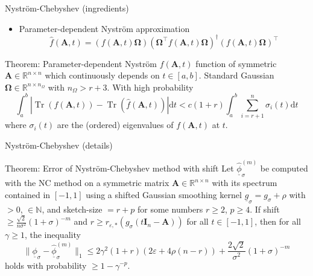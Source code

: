 \documentclass[aspectratio=169, leqno, 12pt]{beamer}
\newcommand{\mtx}[1]{\boldsymbol{#1}}
\DeclareMathOperator{\Tr}{Tr}
\begin{document}
\begin{frame}{Nystr\"om-Chebyshev (ingredients)}
    \begin{itemize}
        \item Parameter-dependent Nystr\"om approximation
        \begin{equation}
            \widehat{f}(\mtx{A}, t) = (f(\mtx{A}, t) \mtx{\Omega}) (\mtx{\Omega}^{\top} f(\mtx{A}, t) \mtx{\Omega})^{\dagger} (f(\mtx{A}, t) \mtx{\Omega})^{\top}
        \end{equation}
    \end{itemize}
    \begin{block}{Theorem: Parameter-dependent Nystr\"om \cite{he2023parameter}}
        $f(\mtx{A}, t)$ function of symmetric $\mtx{A} \in \mathbb{R}^{n \times n}$ which
        continuously depends on $t \in [a,b]$. 
        Standard Gaussian $\mtx{\Omega} \in \mathbb{R}^{n \times n_{\Omega}}$
        with $n_{\Omega} > r + 3$. With high probability
        \begin{equation}
            \int_{a}^{b} | \Tr(f(\mtx{A}, t)) - \Tr(\widehat{f}(\mtx{A}, t))| \mathrm{d}t
                < c (1 + r) \int_{a}^{b} \sum_{i = r+1}^n \sigma_i(t) \mathrm{d}t
        \end{equation}
        where $\sigma_i(t)$ are the (ordered) eigenvalues of $f(\mtx{A}, t)$ at $t$.
    \end{block}
\end{frame}

\begin{frame}{Nystr\"om-Chebyshev (details)}
    \begin{block}{Theorem: Error of Nystr\"om-Chebyshev method with shift}
        Let $\widehat{\underline{\phi}}_{\sigma}^{(m)}$ be computed with
        the \gls{NC} method on a symmetric matrix
        $\mtx{A} \in \mathbb{R}^{n \times n}$ with its spectrum contained in $[-1, 1]$
        using a shifted Gaussian smoothing kernel $\underline{g}_{\sigma} = g_{\sigma} + \rho$
        with  $>0$,  $\in \mathbb{N}$, and
        \gls{sketch-size} $=r + p$ for some numbers $r \geq 2$, $p \geq 4$.
        If \gls{shift} $\geq \frac{\sqrt{2}}{n \sigma^2}  (1 + \sigma)^{-m}$
        and $r \geq r_{\varepsilon, \ast}(g_{\sigma}(t\mtx{I}_n - \mtx{A}))$ for all
        $t \in [-1, 1]$, then for all $\gamma \geq 1$, the inequality
        \begin{equation}
            \lVert \underline{\phi}_{\sigma} - \widehat{\underline{\phi}}_{\sigma}^{(m)} \rVert _1
            \leq 2 \gamma^2(1 + r) (2 \varepsilon + 4 \rho (n-r))
            + \frac{2\sqrt{2}}{\sigma^2} (1 + \sigma)^{-m}
        \end{equation}
        holds with probability $\geq 1-\gamma^{-p}$.
    \end{block}
\end{frame}
\end{document}

